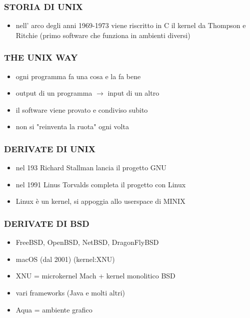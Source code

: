 \documentclass{beamer}
\begin{document}
\begin{frame}
    \frametitle{STORIA DI UNIX}
        \begin{itemize} 
                \item nell' arco degli anni 1969-1973 viene riscritto in C il kernel da Thompson e Ritchie (primo software che funziona in ambienti diversi) 
        \end{itemize}
\end{frame}


\begin{frame}
    \frametitle{THE UNIX WAY}
        \begin{itemize}
            \item ogni programma fa una cosa e la fa bene
            \item output di un programma $\rightarrow$ input di un altro
            \item il software viene provato e condiviso subito
            \item non si "reinventa la ruota" ogni volta
        \end{itemize}
\end{frame}

\begin{frame}
    \frametitle{DERIVATE DI UNIX}
    \begin{itemize}
        \item nel 193 Richard Stallman lancia il progetto GNU 
        \item nel 1991 Linus Torvalds completa il progetto con Linux
        \item Linux è un kernel, si appoggia allo userspace di MINIX
    \end{itemize}
\end{frame}
\begin{frame}
    \frametitle{DERIVATE DI BSD}
    \begin{itemize}
        \item FreeBSD, OpenBSD, NetBSD, DragonFlyBSD
        \item macOS (dal 2001) (kernel:XNU) 
        \item XNU = microkernel Mach + kernel monolitico BSD
        \item vari frameworks (Java e molti altri)
        \item Aqua = ambiente grafico 
    \end{itemize}
\end{frame}
\end{document}
